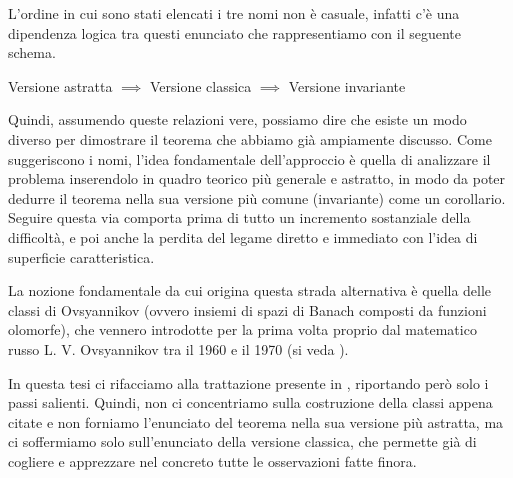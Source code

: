 L'ordine in cui sono stati elencati i tre nomi non è casuale, infatti c'è una dipendenza logica tra questi enunciato che rappresentiamo con il seguente schema.

\begin{center}
Versione astratta $\implies$ Versione classica $\implies$ Versione invariante
\end{center}

Quindi, assumendo queste relazioni vere, possiamo dire che esiste un modo diverso per dimostrare il teorema che abbiamo già ampiamente discusso. 
Come suggeriscono i nomi, l'idea fondamentale dell'approccio è quella di analizzare il problema inserendolo in quadro teorico più generale e astratto, in modo da poter dedurre il teorema nella sua versione più comune (invariante) come un corollario.
Seguire questa via comporta prima di tutto un incremento sostanziale della difficoltà, e poi anche la perdita del legame diretto e immediato con l'idea di superficie caratteristica.

La nozione fondamentale da cui origina questa strada alternativa è quella delle classi di Ovsyannikov (ovvero insiemi di spazi di Banach composti da funzioni olomorfe), che vennero introdotte per la prima volta proprio dal matematico russo L. V. Ovsyannikov tra il 1960 e il 1970 (si veda \cite{Ovsyannikov}).

In questa tesi ci rifacciamo alla trattazione presente in \cite[cap.17-19]{Treves}, riportando però solo i passi salienti. Quindi, non ci concentriamo sulla costruzione della classi appena citate e non forniamo l'enunciato del teorema nella sua versione più astratta, ma ci soffermiamo solo sull'enunciato della versione classica, che permette già di cogliere e apprezzare nel concreto tutte le osservazioni fatte finora.

\begin{theorem}
\end{theorem}

